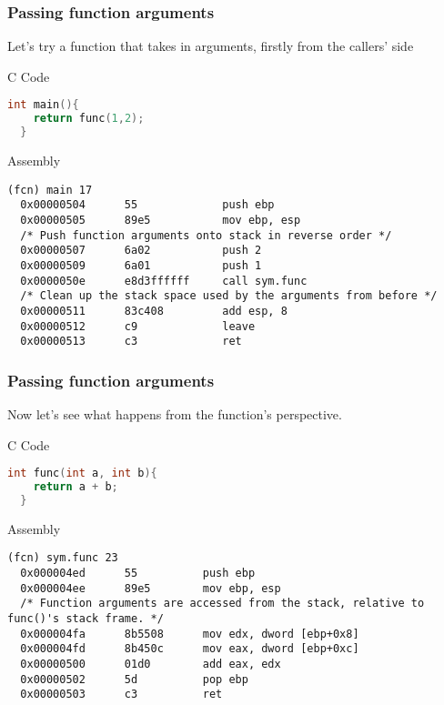 \documentclass{beamer}
\begin{document}
\begin{frame}[fragile]
  \frametitle{Passing function arguments}
  Let's try a function that takes in arguments, firstly from the callers' side
  \begin{block}{C Code}
  \begin{lstlisting}[language=C, basicstyle=\small\ttfamily]
  int main(){
    return func(1,2);
  }
  \end{lstlisting}
\end{block}
\end{frame}
\begin{frame}[fragile]
\begin{block}{Assembly}
\begin{lstlisting}[basicstyle=\small\ttfamily]
(fcn) main 17
  0x00000504      55             push ebp
  0x00000505      89e5           mov ebp, esp
  /* Push function arguments onto stack in reverse order */
  0x00000507      6a02           push 2
  0x00000509      6a01           push 1
  0x0000050e      e8d3ffffff     call sym.func
  /* Clean up the stack space used by the arguments from before */
  0x00000511      83c408         add esp, 8
  0x00000512      c9             leave
  0x00000513      c3             ret
\end{lstlisting}
\end{block}
\end{frame}

\begin{frame}[fragile]
  \frametitle{Passing function arguments}
  Now let's see what happens from the function's perspective.
  \begin{block}{C Code}
  \begin{lstlisting}[language=C]
  int func(int a, int b){
    return a + b;
  }
  \end{lstlisting}
\end{block}
\end{frame}

\begin{frame}[fragile]
\begin{block}{Assembly}
\begin{lstlisting}[basicstyle=\small\ttfamily]
(fcn) sym.func 23
  0x000004ed      55          push ebp
  0x000004ee      89e5        mov ebp, esp
  /* Function arguments are accessed from the stack, relative to func()'s stack frame. */
  0x000004fa      8b5508      mov edx, dword [ebp+0x8]
  0x000004fd      8b450c      mov eax, dword [ebp+0xc]
  0x00000500      01d0        add eax, edx
  0x00000502      5d          pop ebp
  0x00000503      c3          ret
\end{lstlisting}
\end{block}
\end{frame}
\end{document}
